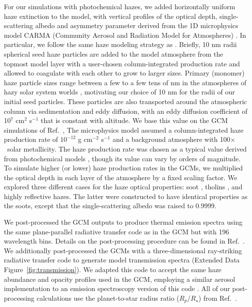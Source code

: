 \documentclass[pdflatex,sn-standardnature]{sn-jnl}%
\begin{document}
For our simulations with photochemical hazes, we added horizontally uniform haze extinction to the model, with vertical profiles of the optical depth, single-scattering albedo and asymmetry parameter derived from the 1D microphysics model CARMA (Community Aerosol and Radiation Model for Atmospheres) \cite{toon1979,ackerman1995}. In particular, we follow the same haze modeling strategy as \cite{adams19}. Briefly, 10 nm radii spherical seed haze particles are added to the model atmosphere from the topmost model layer with a user-chosen column-integrated production rate and allowed to coagulate with each other to grow to larger sizes. Primary (monomer) haze particle sizes range between a few to a few tens of nm in the atmospheres of hazy solar system worlds \cite{tomasko2009,lavvas2010,gladstone2016}, motivating our choice of 10 nm for the radii of our initial seed particles. These particles are also transported around the atmospheric column via sedimentation and eddy diffusion, with an eddy diffusion coefficient of 10$^7$ cm$^2$ s$^{-1}$ that is constant with altitude. We base this value on the GCM simulations of Ref.~\cite{charnay15b}, The microphysics model assumed a column-integrated haze production rate of $10^{-12}$ g cm$^{-2}$ s$^{-1}$ and a background atmosphere with 100$\times$~solar metallicity. The haze production rate was chosen as a typical value derived from photochemical models \cite[e.g.,][]{kawashima19b}, though its value can vary by orders of magnitude. 
To simulate higher (or lower) haze production rates in the GCMs, we multiplied the optical depth in each layer of the atmosphere by a fixed scaling factor.  We explored three different cases for the haze optical properties: soot \cite{lavvas17}, tholins \cite{khare84}, and highly reflective hazes.  The latter were constructed to have identical properties as the soots, except that the single-scattering albedo was raised to 0.9999. 

We post-processed the GCM outputs to produce thermal emission spectra using the same plane-parallel radiative transfer code as in the GCM but with 196 wavelength bins. Details on the post-processing procedure can be found in Ref.~\citep{parmentier16}. We additionally post-processed the GCMs with a three-dimensional ray-striking radiative transfer code \cite{kempton2012constraining, savel2023diagnosing} to generate model transmission spectra (Extended Data Figure~\ref{fig:transmission}). We adapted this code to accept the same haze abundance and opacity profiles used in the GCM, employing a similar aerosol implementation to an emission spectroscopy version of this code \citep{harada2021signatures}.  All of our post-processing calculations use the planet-to-star radius ratio ($R_p/R_\star$) from Ref.~\cite{cloutier21}.
\end{document}
